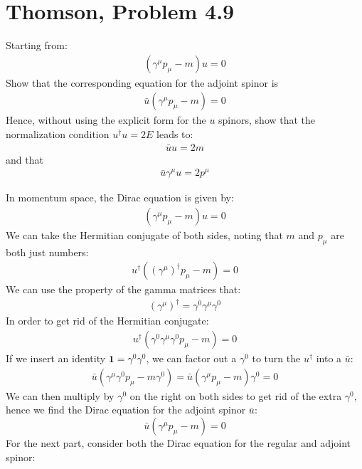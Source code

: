 \documentclass[12pt]{article}
\begin{document}
\section{Thomson, Problem 4.9}
\begin{problem}
  Starting from:
  \begin{align*}
    (\gamma^\mu p_\mu-m)u=0
  \end{align*}
  Show that the corresponding equation for the adjoint spinor is
  \begin{align*}
    \bar{u}(\gamma^\mu p_\mu-m)=0
  \end{align*}
  Hence, without using the explicit form for the $u$ spinors, show that the normalization condition $u^\dag u=2E$ leads to:
  \begin{align*}
    \bar{u}u=2m
  \end{align*}
  and that
  \begin{align*}
    \bar{u}\gamma^\mu u=2p^\mu
  \end{align*}
\end{problem}
In momentum space, the Dirac equation is given by:
\begin{align*}
  (\gamma^\mu p_\mu-m)u=0
\end{align*}
We can take the Hermitian conjugate of both sides, noting that $m$ and $p_\mu$ are both just numbers:
\begin{align*}
  u^\dag({(\gamma^\mu)}^\dag p_\mu-m)=0
\end{align*}
We can use the property of the gamma matrices that:
\begin{align*}
  {(\gamma^\mu)}^\dag=\gamma^0\gamma^\mu\gamma^0
\end{align*}
In order to get rid of the Hermitian conjugate:
\begin{align*}
  u^\dag(\gamma^0\gamma^\mu\gamma^0 p_\mu-m)=0
\end{align*}
If we insert an identity $\bm{1}=\gamma^0\gamma^0$, we can factor out a $\gamma^0$ to turn the $u^\dag$ into a $\bar{u}$:
\begin{align*}
  \bar{u}(\gamma^\mu\gamma^0 p_\mu-m\gamma^0)
  =\bar{u}(\gamma^\mu p_\mu-m)\gamma^0=0
\end{align*}
We can then multiply by $\gamma^0$ on the right on both sides to get rid of the extra $\gamma^0$, hence we find the Dirac equation for the adjoint spinor $\bar{u}$:
\begin{equation}
  \label{eq:p8a}
  \boxed{\bar{u}(\gamma^\mu p_\mu-m)=0}
\end{equation}
For the next part, consider both the Dirac equation for the regular and adjoint spinor:
\end{document}
